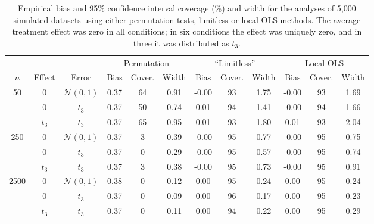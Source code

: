 
\begin{table}
\footnotesize
\begin{tabular}{ccc|ccc|ccc|ccc}
\hline

&&& \multicolumn{ 3 }{c}{Permutation}&\multicolumn{ 3 }{c}{``Limitless''}&\multicolumn{ 3 }{c}{Local OLS}\\
$n$& Effect& Error & Bias&Cover.&Width&Bias&Cover.&Width&Bias&Cover.&Width \\
\hline 
\hline 
\multirow{3}{*}{ 50 } &0& $\mathcal{N}(0,1)$ &0.37&64&0.91&-0.00&93&1.75&-0.00&93&1.69 \\ 
 &  0 & $t_3$ &0.37&50&0.74&0.01&94&1.41&-0.00&94&1.66 \\ 
 &  $t_3$ & $t_3$ &0.37&65&0.95&0.01&93&1.80&0.01&93&2.04 \\ 
\hline 
\multirow{3}{*}{ 250 } &0& $\mathcal{N}(0,1)$ &0.37&3&0.39&-0.00&95&0.77&-0.00&95&0.75 \\ 
 &  0 & $t_3$ &0.37&0&0.29&-0.00&95&0.57&-0.00&95&0.74 \\ 
 &  $t_3$ & $t_3$ &0.37&3&0.38&-0.00&95&0.73&-0.00&95&0.91 \\ 
\hline 
\multirow{3}{*}{ 2500 } &0& $\mathcal{N}(0,1)$ &0.38&0&0.12&0.00&95&0.24&0.00&95&0.24 \\ 
 &  0 & $t_3$ &0.37&0&0.09&0.00&96&0.17&0.00&95&0.23 \\ 
 &  $t_3$ & $t_3$ &0.37&0&0.11&0.00&94&0.22&0.00&95&0.29 \\ 
\hline
\end{tabular}
  \caption{Empirical bias and 95\% confidence interval coverage (\%) and width for the analyses of 5,000 simulated datasets using either permutation tests, limitless or local OLS methods. The average treatment effect was zero in all conditions; in six conditions the effect was uniquely zero, and in three it was distributed as $t_3$.}
  \label{tab:level}
\end{table}
